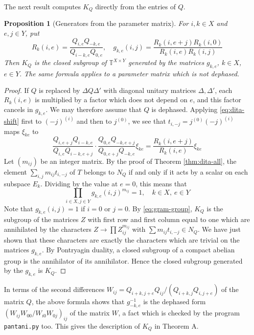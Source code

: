 \documentclass[11pt,reqno]{amsart}
\newtheorem{prop}[thm]{Proposition}
\theoremstyle{definition}
\numberwithin{equation}{section}
\begin{document}
The next result computes $K_Q$ directly from the entries of $Q$.

\begin{prop}[Generators from the parameter matrix]\label{prop:gram-generators}
For $i,k\in X$ and $e,j\in Y$, put
\begin{equation}\label{eq:gram-generators}
R_k(i,e)=\frac{Q_{i,e}Q_{-k,e}}{Q_{i-k,e}Q_{0,e}},\quad
g_{k,e}(i,j)=\frac{R_k(i,e+j)R_k(i,0)}{R_k(i,e)R_k(i,j)}
\end{equation}
Then $K_Q$ is the closed subgroup of $\mathbb T^{X\times Y}$ generated by the matrices $g_{k,e}$, $k\in X$, $e\in Y$. The same formula applies to a parameter matrix which is not dephased.
\end{prop}

\begin{proof}
If $Q$ is replaced by $\Delta Q\Delta'$ with diagonal unitary matrices $\Delta,\Delta'$, each $R_k(i,e)$ is multiplied by a factor which does not depend on $e$, and this factor cancels in $g_{k,e}$. We may therefore assume that $Q$ is dephased. Applying \eqref{eq:dita-shift} first to $(-j)^{(i)}$ and then to $j^{(0)}$, we see that $t_{i,-j}=j^{(0)}(-j)^{(i)}$ maps $\xi_{ke}$ to
$$\frac{Q_{i,e+j}Q_{i-k,e}}{Q_{i,e}Q_{i-k,e+j}}\cdot\frac{Q_{0,e}Q_{-k,e+j}}{Q_{0,e+j}Q_{-k,e}}\xi_{ke}
=\frac{R_k(i,e+j)}{R_k(i,e)}\xi_{ke}$$
Let $(m_{ij})$ be an integer matrix. By the proof of Theorem \ref{thm:dita-all}, the element $\sum_{i,j}m_{ij}t_{i,-j}$ of $T$ belongs to $N_Q$ if and only if it acts by a scalar on each subspace $E_k$. Dividing by the value at $e=0$, this means that
$$\prod_{i\in X,j\in Y}g_{k,e}(i,j)^{m_{ij}}=1,
\quad k\in X,\ e\in Y$$
Note that $g_{k,e}(i,j)=1$ if $i=0$ or $j=0$. By \eqref{eq:gram-group}, $K_Q$ is the subgroup of the matrices $Z$ with first row and first column equal to one which are annihilated by the characters $Z\to\prod Z_{ij}^{m_{ij}}$ with $\sum m_{ij}t_{i,-j}\in N_Q$. We have just shown that these characters are exactly the characters which are trivial on the matrices $g_{k,e}$. By Pontryagin duality, a closed subgroup of a compact abelian group is the annihilator of its annihilator. Hence the closed subgroup generated by the $g_{k,e}$ is $K_Q$.
\end{proof}

In terms of the second differences $W_{ij}=Q_{i+k,j+e}Q_{ij}/(Q_{i+k,j}Q_{i,j+e})$ of the matrix $Q$, the above formula shows that $g_{-k,e}^{-1}$ is the dephased form $(W_{ij}W_{00}/W_{i0}W_{0j})_{ij}$ of the matrix $W$, a fact which is checked by the program \texttt{pantani.py} too. This gives the description of $K_Q$ in Theorem A.
\end{document}
